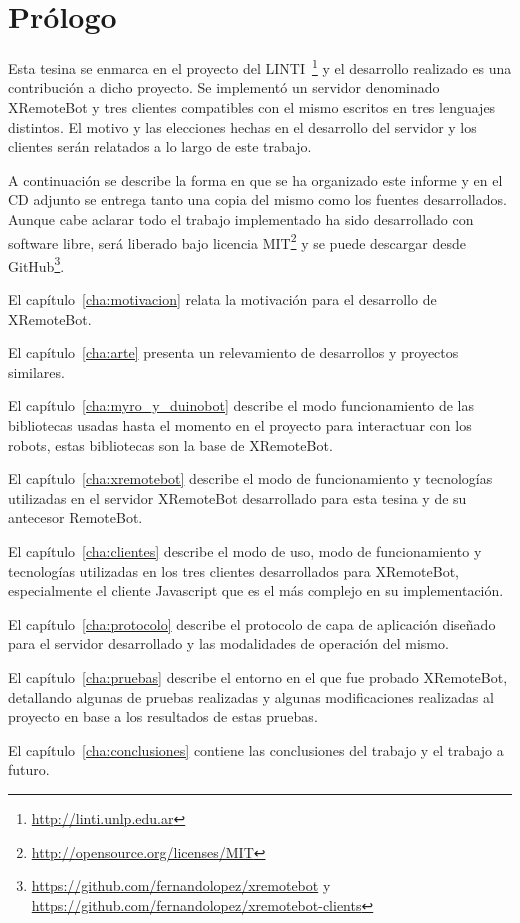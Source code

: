 \chapter*{Prólogo}\label{cha:prologo}


Esta tesina se enmarca en el proyecto \proyecto{} del
LINTI~\footnote{\url{http://linti.unlp.edu.ar}}
y el desarrollo realizado
es una contribución a dicho proyecto.
Se implementó un servidor denominado XRemoteBot y tres
clientes compatibles
con el mismo escritos en tres lenguajes distintos. El motivo y las elecciones hechas
en el desarrollo del servidor y los clientes serán relatados a lo largo de este
trabajo.

A continuación se describe la forma en que se ha organizado este informe y en el CD
adjunto se entrega tanto una copia del mismo como los fuentes desarrollados.
Aunque
cabe aclarar todo el trabajo implementado ha sido desarrollado con software libre,
será liberado bajo licencia
MIT\footnote{\url{http://opensource.org/licenses/MIT}} y se puede descargar
desde GitHub\footnote{%
\url{https://github.com/fernandolopez/xremotebot} y
\url{https://github.com/fernandolopez/xremotebot-clients}}.

El capítulo~\ref{cha:motivacion} relata la motivación para el desarrollo de
XRemoteBot.

El capítulo~\ref{cha:arte} presenta un relevamiento de desarrollos y
proyectos similares.

El capítulo~\ref{cha:myro_y_duinobot} describe el modo funcionamiento de las
bibliotecas usadas hasta el momento en el proyecto \proyecto{} para
interactuar con los robots, estas
bibliotecas son la base de XRemoteBot.

El capítulo~\ref{cha:xremotebot} describe el modo de funcionamiento y
tecnologías utilizadas en el servidor
XRemoteBot desarrollado para esta tesina y de su antecesor RemoteBot.

El capítulo~\ref{cha:clientes} describe el modo de uso, modo de
funcionamiento y
tecnologías utilizadas en los tres clientes desarrollados para
XRemoteBot, especialmente el cliente Javascript que es el más complejo
en su implementación.

El capítulo~\ref{cha:protocolo} describe el protocolo de capa de aplicación diseñado para
el servidor desarrollado y las modalidades de operación del mismo.

El capítulo~\ref{cha:pruebas} describe el entorno en el que fue probado
XRemoteBot, detallando algunas de pruebas realizadas y algunas
modificaciones
realizadas al proyecto en base a los resultados de estas pruebas.

El capítulo~\ref{cha:conclusiones} contiene las conclusiones del trabajo
y el trabajo a futuro.
